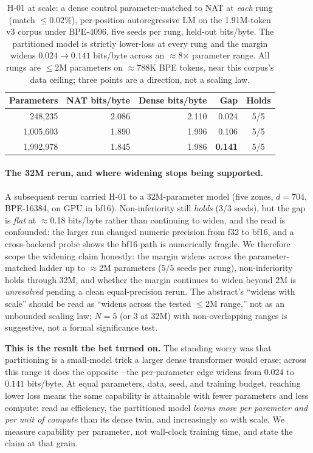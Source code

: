 \documentclass[11pt]{article}
\begin{document}
\begin{table}[h]\centering\small
\begin{tabular}{@{}rrrrc@{}}
\toprule
Parameters & NAT bits/byte & Dense bits/byte & Gap & Holds \\
\midrule
248{,}235 & 2.086 & 2.110 & 0.024 & 5/5 \\
1{,}005{,}603 & 1.890 & 1.996 & 0.106 & 5/5 \\
1{,}992{,}978 & 1.845 & 1.986 & \textbf{0.141} & 5/5 \\
\bottomrule
\end{tabular}
\caption{H-01 at scale: a dense control parameter-matched to NAT at \emph{each} rung (match
$\le0.02\%$), per-position autoregressive LM on the 1.91M-token v3 corpus under BPE-4096, five seeds
per rung, held-out bits/byte. The partitioned model is strictly lower-loss at every rung and the
margin widens $0.024 \to 0.141$ bits/byte across an $\approx$8$\times$ parameter range. All rungs are
$\le$2M parameters on $\approx$788K BPE tokens, near this corpus's data ceiling; three points are a
direction, not a scaling law.}
\label{tab:h01ladder}
\end{table}

\paragraph{The 32M rerun, and where widening stops being supported.}
A subsequent rerun carried H-01 to a 32M-parameter model (five zones, $d{=}704$, BPE-16384, on GPU
in bf16). Non-inferiority still \emph{holds} (3/3 seeds), but the gap is \emph{flat} at
$\approx$0.18 bits/byte rather than continuing to widen, and the read is confounded: the larger run
changed numeric precision from f32 to bf16, and a cross-backend probe shows the bf16 path is
numerically fragile. We therefore scope the widening claim honestly: the margin widens across the
parameter-matched ladder up to $\approx$2M parameters ($5/5$ seeds per rung), non-inferiority holds
through 32M, and whether the margin continues to widen beyond 2M is \emph{unresolved} pending a clean
equal-precision rerun. The abstract's ``widens with scale'' should be read as ``widens across the
tested $\le$2M range,'' not as an unbounded scaling law; $N{=}5$ (or $3$ at 32M) with non-overlapping
ranges is suggestive, not a formal significance test.

\textbf{This is the result the bet turned on.} The standing worry was that partitioning is a
small-model trick a larger dense transformer would erase; across this range it does the opposite---the
per-parameter edge widens from $0.024$ to $0.141$ bits/byte. At equal parameters, data, seed, and
training budget, reaching lower loss means the same capability is attainable with fewer parameters
and less compute: read as efficiency, the partitioned model \emph{learns more per parameter and per
unit of compute} than its dense twin, and increasingly so with scale. We measure capability per
parameter, not wall-clock training time, and state the claim at that grain.
\end{document}

